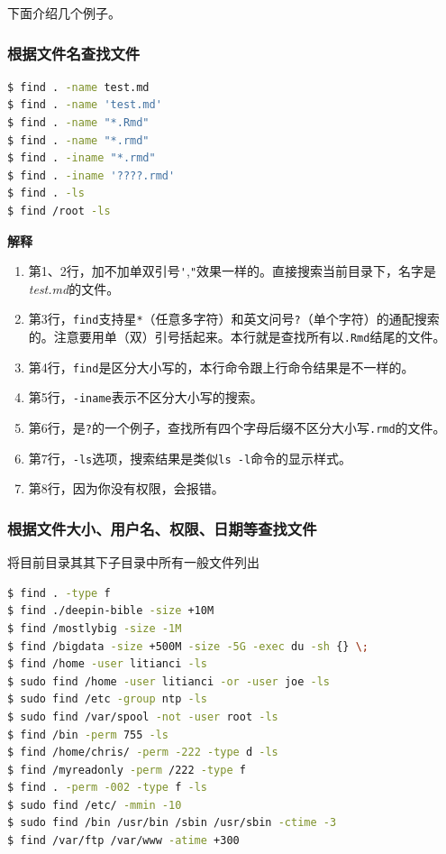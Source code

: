 \documentclass[doctor,openright,twoside]{sjtuthesis}
\providecommand{\tightlist}{%
    \setlength{\itemsep}{0pt}\setlength{\parskip}{0pt}}
\newcommand{\passthrough}[1]{#1}
\theoremstyle{plain}
\theoremstyle{definition}
\theoremstyle{remark}
\theoremstyle{ocrenumbox}
\theoremstyle{plain}
\begin{document}
下面介绍几个例子。

\hypertarget{section-79}{%
\subsubsection{根据文件名查找文件}\label{section-79}}

\begin{lstlisting}[language=bash]
$ find . -name test.md
$ find . -name 'test.md'
$ find . -name "*.Rmd"
$ find . -name "*.rmd"
$ find . -iname "*.rmd"
$ find . -iname '????.rmd'
$ find . -ls
$ find /root -ls
\end{lstlisting}

\textbf{解释}

\begin{enumerate}
\def\labelenumi{\arabic{enumi}.}
\tightlist
\item
  第1、2行，加不加单双引号\passthrough{\lstinline!'!},\passthrough{\lstinline!"!}效果一样的。直接搜索当前目录下，名字是\emph{test.md}的文件。
\item
  第3行，\passthrough{\lstinline!find!}支持星\passthrough{\lstinline!*!}（任意多字符）和英文问号\passthrough{\lstinline!?!}（单个字符）的通配搜索的。注意要用单（双）引号括起来。本行就是查找所有以\passthrough{\lstinline!.Rmd!}结尾的文件。
\item
  第4行，\passthrough{\lstinline!find!}是区分大小写的，本行命令跟上行命令结果是不一样的。
\item
  第5行，\passthrough{\lstinline!-iname!}表示不区分大小写的搜索。
\item
  第6行，是\passthrough{\lstinline!?!}的一个例子，查找所有四个字母后缀不区分大小写\passthrough{\lstinline!.rmd!}的文件。
\item
  第7行，\passthrough{\lstinline!-ls!}选项，搜索结果是类似\passthrough{\lstinline!ls -l!}命令的显示样式。
\item
  第8行，因为你没有权限，会报错。
\end{enumerate}

\hypertarget{section-80}{%
\subsubsection{根据文件大小、用户名、权限、日期等查找文件}\label{section-80}}

将目前目录其其下子目录中所有一般文件列出

\begin{lstlisting}[language=bash]
$ find . -type f
$ find ./deepin-bible -size +10M
$ find /mostlybig -size -1M
$ find /bigdata -size +500M -size -5G -exec du -sh {} \;
$ find /home -user litianci -ls
$ sudo find /home -user litianci -or -user joe -ls
$ sudo find /etc -group ntp -ls
$ sudo find /var/spool -not -user root -ls
$ find /bin -perm 755 -ls
$ find /home/chris/ -perm -222 -type d -ls
$ find /myreadonly -perm /222 -type f
$ find . -perm -002 -type f -ls
$ sudo find /etc/ -mmin -10
$ sudo find /bin /usr/bin /sbin /usr/sbin -ctime -3
$ find /var/ftp /var/www -atime +300
\end{lstlisting}
\end{document}

